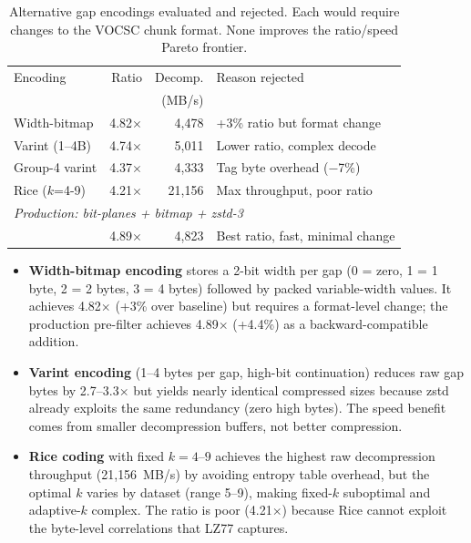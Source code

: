 \documentclass[10pt,twocolumn,letterpaper]{article}
\begin{document}
\begin{table}[h]
\centering
\caption{Alternative gap encodings evaluated and rejected. Each would require changes to the VOCSC chunk format. None improves the ratio/speed Pareto frontier.}
\label{tab:rejected_codecs}
\footnotesize
\begin{tabular}{lrrl}
\toprule
Encoding & Ratio & Decomp. & Reason rejected \\
 & & (MB/s) & \\
\midrule
Width-bitmap  & 4.82$\times$ & 4{,}478 & +3\% ratio but format change \\
Varint (1--4B) & 4.74$\times$ & 5{,}011 & Lower ratio, complex decode \\
Group-4 varint & 4.37$\times$ & 4{,}333 & Tag byte overhead ($-$7\%) \\
Rice ($k$=4-9) & 4.21$\times$ & 21{,}156 & Max throughput, poor ratio \\
\midrule
\multicolumn{4}{l}{\textit{Production: bit-planes + bitmap + zstd-3}} \\
 & 4.89$\times$ & 4{,}823 & Best ratio, fast, minimal change \\
\bottomrule
\end{tabular}
\end{table}

\begin{itemize}
\item \textbf{Width-bitmap encoding} stores a 2-bit width per gap (0 = zero, 1 = 1 byte, 2 = 2 bytes, 3 = 4 bytes) followed by packed variable-width values.
  It achieves 4.82$\times$ (+3\% over baseline) but requires a format-level change; the production pre-filter achieves 4.89$\times$ (+4.4\%) as a backward-compatible addition.
\item \textbf{Varint encoding} (1--4 bytes per gap, high-bit continuation) reduces raw gap bytes by 2.7--3.3$\times$ but yields nearly identical compressed sizes because zstd already exploits the same redundancy (zero high bytes).
  The speed benefit comes from smaller decompression buffers, not better compression.
\item \textbf{Rice coding} with fixed $k = 4$--$9$ achieves the highest raw decompression throughput (21{,}156~MB/s) by avoiding entropy table overhead, but the optimal $k$ varies by dataset (range 5--9), making fixed-$k$ suboptimal and adaptive-$k$ complex.
  The ratio is poor (4.21$\times$) because Rice cannot exploit the byte-level correlations that LZ77 captures.
\end{itemize}
\end{document}
